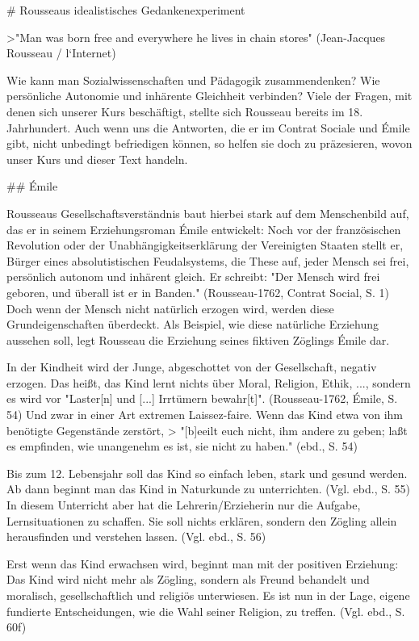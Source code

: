 # Rousseaus idealistisches Gedankenexperiment

>"Man was born free and everywhere he lives in chain stores" (Jean-Jacques Rousseau / l`Internet)

Wie kann man Sozialwissenschaften und Pädagogik zusammendenken?
Wie persönliche Autonomie und inhärente Gleichheit verbinden?
Viele der Fragen, mit denen sich unserer Kurs beschäftigt, stellte sich Rousseau bereits im 18. Jahrhundert.
Auch wenn uns die Antworten, die er im Contrat Sociale und Émile gibt, nicht unbedingt befriedigen können, so helfen sie doch zu präzesieren, wovon unser Kurs und dieser Text handeln.


## Émile

Rousseaus Gesellschaftsverständnis baut hierbei stark auf dem Menschenbild auf, das er in seinem Erziehungsroman Émile entwickelt:
Noch vor der französischen Revolution oder der Unabhängigkeitserklärung der Vereinigten Staaten stellt er, Bürger eines absolutistischen Feudalsystems, die These auf, jeder Mensch sei frei, persönlich autonom und inhärent gleich.
Er schreibt: "Der Mensch wird frei geboren, und überall ist er in Banden." (Rousseau-1762, Contrat Social, S. 1)
Doch wenn der Mensch nicht natürlich erzogen wird, werden diese Grundeigenschaften überdeckt.
Als Beispiel, wie diese natürliche Erziehung aussehen soll, legt Rousseau die Erziehung seines fiktiven Zöglings Émile dar.

In der Kindheit wird der Junge, abgeschottet von der Gesellschaft, negativ erzogen.
Das heißt, das Kind lernt nichts über Moral, Religion, Ethik, ..., sondern es wird vor "Laster[n] und [...] Irrtümern bewahr[t]". (Rousseau-1762, Émile, S. 54)
Und zwar in einer Art extremen Laissez-faire.
Wenn das Kind etwa von ihm benötigte Gegenstände zerstört,
> "[b]eeilt euch nicht, ihm andere zu geben; laßt es empfinden, wie unangenehm es ist, sie nicht zu haben." (ebd., S. 54)

Bis zum 12. Lebensjahr soll das Kind so einfach leben, stark und gesund werden.
Ab dann beginnt man das Kind in Naturkunde zu unterrichten. (Vgl. ebd., S. 55)
In diesem Unterricht aber hat die Lehrerin/Erzieherin nur die Aufgabe, Lernsituationen zu schaffen.
Sie soll nichts erklären, sondern den Zögling allein herausfinden und verstehen lassen. (Vgl. ebd., S. 56)

Erst wenn das Kind erwachsen wird, beginnt man mit der positiven Erziehung:
Das Kind wird nicht mehr als Zögling, sondern als Freund behandelt und moralisch, gesellschaftlich und religiös unterwiesen.
Es ist nun in der Lage, eigene fundierte Entscheidungen, wie die Wahl seiner Religion, zu treffen. (Vgl. ebd., S. 60f)

